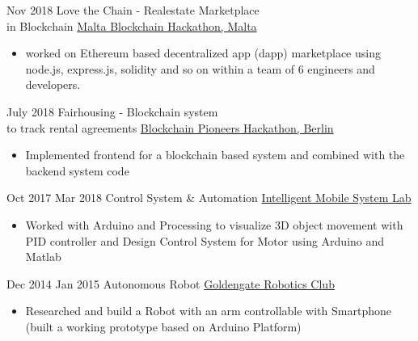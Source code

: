 \documentclass[letterpaper]{twentysecondcv} %
\begin{document}
\begin{twenty}
    \twentyitem
        {Nov 2018}
        {}
        {Love the Chain - Realestate Marketplace \\in Blockchain}
          {\href{}{Malta Blockchain Hackathon, Malta}}
        {
        {\begin{itemize}
            \item worked on Ethereum based decentralized app (dapp) marketplace using node.js, express.js, solidity and so on within a team of 6 engineers and developers.\\
        \end{itemize}}
        }
        
    \twentyitem
        {July 2018}
        {}
        {Fairhousing - Blockchain system \\to track rental agreements}
          {\href{https://berlin.impacthub.net/consultancy/our-offer/community-and-ecosystem-building/blockch8n-pioneers-hackathon/}{Blockchain Pioneers Hackathon, Berlin}}
        {
        {\begin{itemize}
            \item Implemented frontend for a blockchain based system and combined with the backend system code\\
        \end{itemize}}
        }

    \twentyitem
        {Oct 2017}
        {Mar 2018}
        {Control System \& Automation }
        {\href{http://imsys.user.jacobs-university.de}{Intelligent Mobile System Lab}}
        {
        {\begin{itemize}
            \item Worked with Arduino and Processing to visualize 3D object movement with PID controller and Design Control System for Motor using Arduino and Matlab\\
        \end{itemize}}
        }
        
    \twentyitem
        {Dec 2014}
        {Jan 2015}
        {Autonomous Robot }
        {\href{}{Goldengate Robotics Club}}
        {
        {\begin{itemize}
            \item Researched and build a Robot with an arm controllable with Smartphone (built a working prototype based on Arduino Platform)\\
        \end{itemize}}
        }

\end{twenty}
\end{document}
